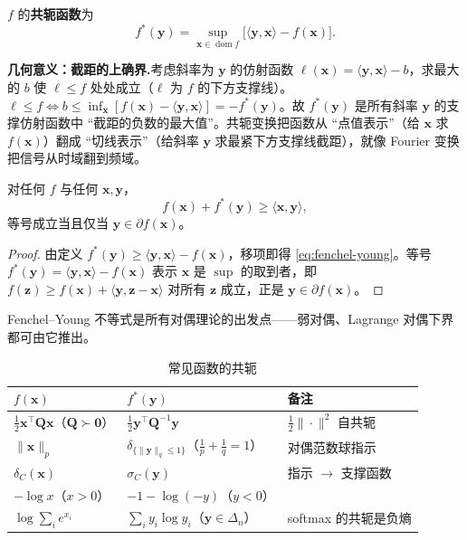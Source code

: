 \begin{definition}\label{def:conjugate}
$f$ 的\textbf{共轭函数}为
\begin{equation}
  f^\ast(\mathbf y)=\sup_{\mathbf x\in\operatorname{dom}f}\big[\langle\mathbf y,\mathbf x\rangle-f(\mathbf x)\big].
  \label{eq:conjugate}
\end{equation}
\end{definition}

\noindent\textbf{几何意义：截距的上确界.}\;考虑斜率为 $\mathbf y$ 的仿射函数 $\ell(\mathbf x)=\langle\mathbf y,\mathbf x\rangle-b$，求最大的 $b$ 使 $\ell\le f$ 处处成立（$\ell$ 为 $f$ 的下方支撑线）。$\ell\le f\iff b\le\inf_{\mathbf x}[f(\mathbf x)-\langle\mathbf y,\mathbf x\rangle]=-f^\ast(\mathbf y)$。故 $f^\ast(\mathbf y)$ 是所有斜率 $\mathbf y$ 的支撑仿射函数中 “截距的负数的最大值”。共轭变换把函数从 “点值表示”（给 $\mathbf x$ 求 $f(\mathbf x)$）翻成 “切线表示”（给斜率 $\mathbf y$ 求最紧下方支撑线截距），就像 Fourier 变换把信号从时域翻到频域。

\begin{theorem}\label{thm:fenchel-young}
对任何 $f$ 与任何 $\mathbf x,\mathbf y$，
\begin{equation}
  f(\mathbf x)+f^\ast(\mathbf y)\ge\langle\mathbf x,\mathbf y\rangle,
  \label{eq:fenchel-young}
\end{equation}
等号成立当且仅当 $\mathbf y\in\partial f(\mathbf x)$。
\end{theorem}
\begin{proof}
由定义 $f^\ast(\mathbf y)\ge\langle\mathbf y,\mathbf x\rangle-f(\mathbf x)$，移项即得 \cref{eq:fenchel-young}。等号 $f^\ast(\mathbf y)=\langle\mathbf y,\mathbf x\rangle-f(\mathbf x)$ 表示 $\mathbf x$ 是 $\sup$ 的取到者，即 $f(\mathbf z)\ge f(\mathbf x)+\langle\mathbf y,\mathbf z-\mathbf x\rangle$ 对所有 $\mathbf z$ 成立，正是 $\mathbf y\in\partial f(\mathbf x)$。
\end{proof}

Fenchel--Young 不等式是所有对偶理论的出发点——弱对偶、Lagrange 对偶下界都可由它推出。

\begin{table}[H]\centering\small
\caption{常见函数的共轭}
\label{tab:conjugate}
\begin{tabular}{lll}
\toprule
$f(\mathbf x)$ & $f^\ast(\mathbf y)$ & 备注 \\
\midrule
$\tfrac12\mathbf x^\top\mathbf Q\mathbf x$（$\mathbf Q\succ\mathbf 0$） & $\tfrac12\mathbf y^\top\mathbf Q^{-1}\mathbf y$ & $\tfrac12\|\cdot\|^2$ 自共轭 \\
$\|\mathbf x\|_p$ & $\delta_{\{\|\mathbf y\|_q\le1\}}$（$\tfrac1p+\tfrac1q=1$） & 对偶范数球指示 \\
$\delta_C(\mathbf x)$ & $\sigma_C(\mathbf y)$ & 指示 $\to$ 支撑函数 \\
$-\log x$（$x>0$） & $-1-\log(-y)$（$y<0$） & \\
$\log\sum_i e^{x_i}$ & $\sum_i y_i\log y_i$（$\mathbf y\in\Delta_n$） & softmax 的共轭是负熵 \\
\bottomrule
\end{tabular}
\end{table}

